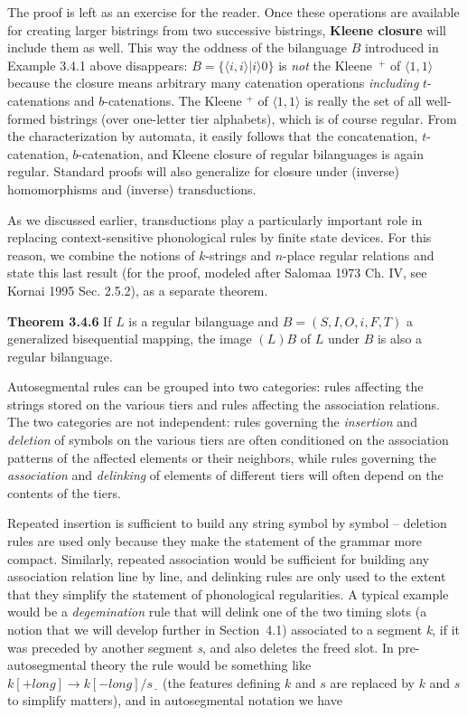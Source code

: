 \smallskip\noindent
The proof is left as an exercise for the reader. Once these operations are
available for creating larger bistrings from two successive bistrings, {\bf
  Kleene closure} will include them as well.  This way the oddness of the
bilanguage $B$ introduced in Example 3.4.1 above disappears: $B = \{\langle
i,i\rangle | i \rangle 0\}$ is {\it not} the Kleene~$^+$ of $\langle
1,1\rangle $ because the closure means arbitrary many catenation operations
{\it including} $t$-catenations and $b$-catenations.  The Kleene $^+$ of
$\langle 1,1\rangle $ is really the set of all well-formed bistrings (over
one-letter tier alphabets), which is of course regular. From the
characterization by automata, it easily follows that the concatenation,
$t$-catenation, $b$-catenation, and Kleene closure of regular bilanguages is
again regular. Standard proofs will also generalize for closure under
(inverse) homomorphisms and (inverse) transductions.

As we discussed earlier, transductions play a particularly important role in
replacing context-sensitive phonological rules by finite state devices. For
this reason, we combine the notions of $k$-strings and $n$-place regular
relations and state this last result (for the proof, modeled after Salomaa
1973 Ch. IV, see Kornai 1995 Sec. 2.5.2), as a separate
theorem.\nocite{Salomaa:1973}

\smallskip\noindent
{\bf Theorem 3.4.6} If $L$ is a regular bilanguage and $B = (S, I, O, i, F,
T)$ a generalized bisequential mapping, the image $(L)B$ of $L$ under $B$ is
also a regular bilanguage.

\smallskip\noindent
Autosegmental rules can be grouped into two categories: rules affecting the
strings stored on the various tiers and rules affecting the association
relations. The two categories are not independent: rules governing the {\it
insertion} and {\it deletion} of symbols on the various tiers are often
conditioned on the association patterns of the affected elements or their
neighbors, while rules governing the {\it association} and {\it delinking} of
elements of different tiers will often depend on the contents of the tiers.
   

Repeated insertion is sufficient to build any string symbol by symbol --
deletion rules are used only because they make the statement of the grammar
more compact. Similarly, repeated association would be sufficient for building
any association relation line by line, and delinking rules are only used to
the extent that they simplify the statement of phonological regularities. A
typical example would be a {\it degemination} rule that will delink one of the
two timing slots (a notion that we will develop further in Section~4.1)
associated to a segment {\it k}, if it was preceded by another segment {\it
  s}, and also deletes the freed slot. In pre-autosegmental theory the rule
would be something like $k[+long] \rightarrow k[-long]/s\underline{\ \ }$ (the
features defining $k$ and $s$ are replaced by $k$ and $s$ to simplify
matters), and in autosegmental notation we have

